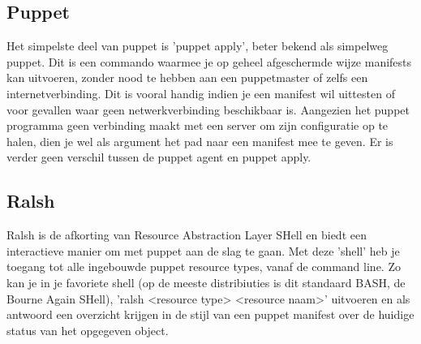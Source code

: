 \subsection{Puppet}
Het simpelste deel van puppet is 'puppet apply', beter bekend als simpelweg puppet. Dit is een commando waarmee je op geheel afgeschermde wijze manifests kan uitvoeren, zonder nood te hebben aan een puppetmaster of zelfs een internetverbinding. Dit is vooral handig indien je een manifest wil uittesten of voor gevallen waar geen netwerkverbinding beschikbaar is. Aangezien het puppet programma geen verbinding maakt met een server om zijn configuratie op te halen, dien je wel als argument het pad naar een manifest mee te geven. Er is verder geen verschil tussen de puppet agent en puppet apply.

\subsection{Ralsh}
Ralsh is de afkorting van Resource Abstraction Layer SHell en biedt een interactieve manier om met puppet aan de slag te gaan. Met deze 'shell' heb je toegang tot alle ingebouwde puppet resource types, vanaf de command line. Zo kan je in je favoriete shell (op de meeste distribiuties is dit standaard BASH, de Bourne Again SHell), 'ralsh <resource type> <resource naam>' uitvoeren en als antwoord een overzicht krijgen in de stijl van een puppet manifest over de huidige status van het opgegeven object.

